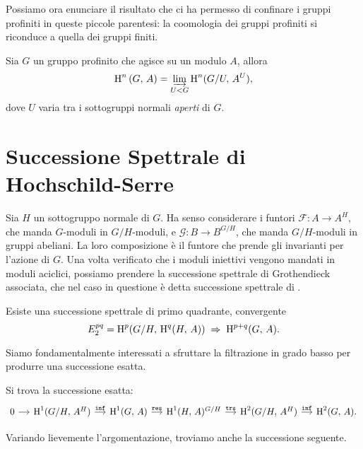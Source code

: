 \begin{profinite}
Possiamo ora enunciare il risultato che ci ha permesso di confinare i gruppi profiniti in queste piccole parentesi: la coomologia dei gruppi profiniti si riconduce a quella dei gruppi finiti.

\begin{proposition}\label{limite}
	Sia $ G $ un gruppo profinito che agisce su un modulo $ A $, allora
	\[ \operatorname{H}^n \left(G, \, A \right)  = \varinjlim_{U < G} \operatorname{H}^n(G/U, \, A^U), \]
	dove $ U $ varia tra i sottogruppi normali \emph{aperti} di $ G $.
\end{proposition}
\end{profinite}


\section{Successione Spettrale di Hochschild-Serre}

Sia $ H $ un sottogruppo normale di $ G $. Ha senso considerare i funtori $ \mathcal{F}\colon A \to A^H $, che manda $ G $-moduli in $ G/H $-moduli, e $ \mathcal{G}\colon B \to B^{G/H} $, che manda $ G/H $-moduli in gruppi abeliani. La loro composizione è il funtore che prende gli invarianti per l'azione di $ G $. Una volta verificato che i moduli iniettivi vengono mandati in moduli aciclici, possiamo prendere la successione spettrale di Grothendieck associata, che nel caso in questione è detta successione spettrale di \HS.

\begin{theorem}
	Esiste una successione spettrale di primo quadrante, convergente
	\[ E^{pq}_2 = \operatorname{H}^p(G/H, \, \operatorname{H}^q(H, \, A)) \;\Rightarrow\; \operatorname{H}^{p+q}(G, \, A). \]
\end{theorem}

Siamo fondamentalmente interessati a sfruttare la filtrazione in grado basso per produrre una successione esatta. 

\begin{corollary}\label{boo1}
	Si trova la successione esatta:
	\[\begin{tikzcd}[column sep = small]
	0 \rar & \HH^1(G/H, \, A^H) \rar["\Inf"]
	& \HH^1(G, \, A) \rar["\Res"]
	& \HH^1(H, \, A)^{G/H} \rar["\mathtt{trs}"]
	& \HH^2(G/H, \, A^H) \rar["\Inf"]
	& \HH^2(G, \, A).
	\end{tikzcd} \]
\end{corollary}

Variando lievemente l'argomentazione, troviamo anche la successione seguente.

